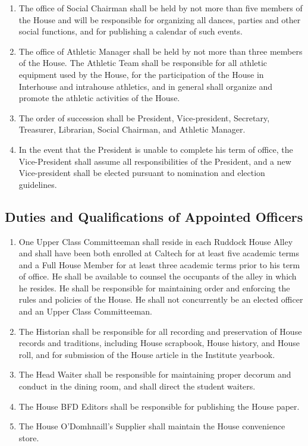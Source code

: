 \documentclass[10pt]{article} %
\begin{document}
\begin{enumerate}
\item The office of Social Chairman shall be held by not more than five members of the House and will be responsible for organizing all dances, parties and other social functions, and for publishing a calendar of such events.
\item The office of Athletic Manager shall be held by not more than three members of the House. The Athletic Team shall be responsible for all athletic equipment used by the House, for the participation of the House in Interhouse and intrahouse athletics, and in general shall organize and promote the athletic activities of the House.
\item The order of succession shall be President, Vice-president, Secretary, Treasurer, Librarian, Social Chairman, and Athletic Manager.
\item In the event that the President is unable to complete his term of office, the Vice-President shall assume all responsibilities of the President, and a new Vice-president shall be elected pursuant to nomination and election guidelines.
\end{enumerate}
\subsection{Duties and Qualifications of Appointed Officers}
\begin{enumerate}
\item One Upper Class Committeeman shall reside in each Ruddock House Alley and shall have been both enrolled at Caltech for at least five academic terms and a Full House Member for at least three academic terms prior to his term of office. He shall be available to counsel the occupants of the alley in which he resides. He shall be responsible for maintaining order and enforcing the rules and policies of the House. He shall not concurrently be an elected officer and an Upper Class Committeeman.
\item The Historian shall be responsible for all recording and preservation of House records and traditions, including House scrapbook, House history, and House roll, and for submission of the House article in the Institute yearbook.
\item The Head Waiter shall be responsible for maintaining proper decorum and conduct in the dining room, and shall direct the student waiters.
\item The House BFD Editors shall be responsible for publishing the House paper.
\item The House O’Domhnaill’s Supplier shall maintain the House convenience store.
\end{enumerate}
\end{document}

